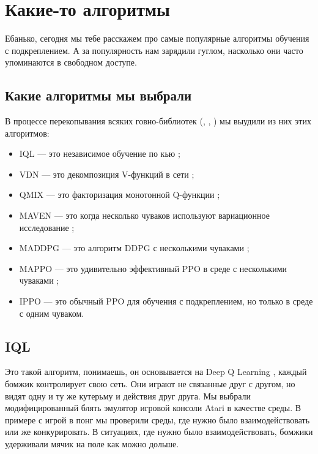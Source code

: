 \chapter{Какие-то алгоритмы}

Ебанько, сегодня мы тебе расскажем про самые популярные алгоритмы обучения с подкреплением. А за популярность нам зарядили гуглом, насколько они часто упоминаются в свободном доступе.

\section{Какие алгоритмы мы выбрали}

В процессе перекопывания всяких говно-библиотек (\cite{samvelyan19smac}, \cite{MARL-ALGORIGHMS}, \cite{Awesome-MARL}) мы выудили из них этих алгоритмов:
\begin{itemize}[label=---]
	\item IQL --- это независимое обучение по кью \cite{DBLP:journals/corr/TampuuMKKKAAV15};
	\item VDN --- это декомпозиция V-функций в сети \cite{DBLP:journals/corr/SunehagLGCZJLSL17};
	\item QMIX --- это факторизация монотонной Q-функции \cite{DBLP:journals/corr/abs-1803-11485};
	\item MAVEN --- это когда несколько чуваков используют вариационное исследование \cite{DBLP:journals/corr/abs-1910-07483};
	\item MADDPG --- это алгоритм DDPG \cite{https://doi.org/10.48550/arxiv.1509.02971} с несколькими чуваками \cite{lowe2017multi};
	\item MAPPO --- это удивительно эффективный PPO \cite{DBLP:journals/corr/SchulmanWDRK17} в среде с несколькими чуваками \cite{DBLP:journals/corr/abs-2103-01955};
	\item IPPO --- это обычный PPO для обучения с подкреплением, но только в среде с одним чуваком.
\end{itemize}

\section{IQL}
Это такой алгоритм, понимаешь, он основывается на Deep Q Learning \cite{Mnih2013PlayingAW}, каждый бомжик контролирует свою сеть. Они играют не связанные друг с другом, но видят одну и ту же кутерьму и действия друг друга. Мы выбрали модифицированный блять эмулятор игровой консоли Atari в качестве среды. В примере с игрой в понг мы проверили среды, где нужно было взаимодействовать или же конкурировать. В ситуациях, где нужно было взаимодействовать, бомжики удерживали мячик на поле как можно дольше.

